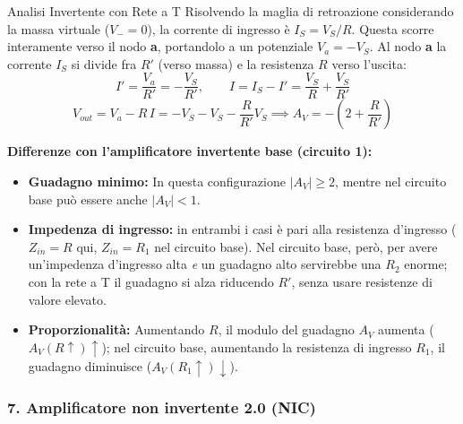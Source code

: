 \begin{teorema}{Analisi Invertente con Rete a T}
    Risolvendo la maglia di retroazione considerando la massa virtuale ($V_- = 0$), la corrente di ingresso è $I_S = V_S/R$. Questa scorre interamente verso il nodo \textbf{a}, portandolo a un potenziale $V_a = -V_S$. Al nodo \textbf{a} la corrente $I_S$ si divide fra $R'$ (verso massa) e la resistenza $R$ verso l'uscita:
    \[ I' = \frac{V_a}{R'} = -\frac{V_S}{R'}, \qquad I = I_S - I' = \frac{V_S}{R} + \frac{V_S}{R'} \]
    \[ V_{out} = V_a - R\,I = -V_S - V_S - \frac{R}{R'}V_S \implies A_V = - \left( 2 + \frac{R}{R'} \right) \]
    
    \noindent \textbf{Differenze con l'amplificatore invertente base (circuito 1):}
    \begin{itemize}[label=$\ast$, leftmargin=*, itemsep=0.1cm, topsep=0.1cm]
        \item \textbf{Guadagno minimo:} In questa configurazione $|A_V| \geq 2$, mentre nel circuito base può essere anche $|A_V| < 1$.
        \item \textbf{Impedenza di ingresso:} in entrambi i casi è pari alla resistenza d'ingresso ($Z_{in} = R$ qui, $Z_{in} = R_1$ nel circuito base). Nel circuito base, però, per avere un'impedenza d'ingresso alta \emph{e} un guadagno alto servirebbe una $R_2$ enorme; con la rete a T il guadagno si alza riducendo $R'$, senza usare resistenze di valore elevato.
        \item \textbf{Proporzionalità:} Aumentando $R$, il modulo del guadagno $A_V$ aumenta ($A_V(R \uparrow) \uparrow$); nel circuito base, aumentando la resistenza di ingresso $R_1$, il guadagno diminuisce ($A_V(R_1 \uparrow) \downarrow$).
    \end{itemize}
\end{teorema}

\vspace{0.4cm}
\subsubsection*{7. Amplificatore non invertente 2.0 (NIC)}

